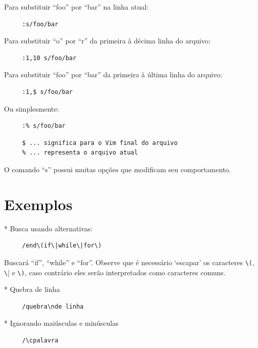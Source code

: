 \documentclass[10pt,a4paper,openany]{book}
\begin{document}
Para substituir ``foo'' por ``bar'' na linha atual:

\begin{verbatim}
     :s/foo/bar
\end{verbatim}

Para substituir ``o'' por ``r'' da primeira à décima linha do arquivo:

\begin{verbatim}
     :1,10 s/foo/bar
\end{verbatim}

Para substituir ``foo'' por ``bar'' da primeira à última linha do arquivo:

\begin{verbatim}
     :1,$ s/foo/bar
\end{verbatim}

Ou simplesmente:

\begin{verbatim}
     :% s/foo/bar
\end{verbatim}

\begin{verbatim}
     $ ... significa para o Vim final do arquivo
     % ... representa o arquivo atual
\end{verbatim}

O comando ``s'' possui muitas opções que modificam seu comportamento.

\section{Exemplos }
\label{Exemplos }

* Busca usando alternativas:

\begin{verbatim}
     /end\(if\|while\|for\)
\end{verbatim}

Buscará ``if'', ``while'' e ``for''.  Observe que é necessário `escapar' os
caracteres \verb|\(|, \verb|\|| e \verb|\)|, caso contrário eles serão
interpretados como caracteres comuns.

* Quebra de linha

\begin{verbatim}
     /quebra\nde linha
\end{verbatim}

* Ignorando maiúsculas e minúsculas

\begin{verbatim}
     /\cpalavra
\end{verbatim}
\end{document}
